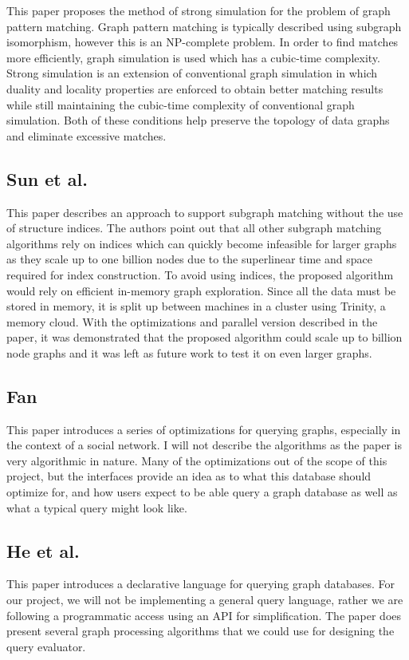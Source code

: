 \documentclass[11pt]{article}
\begin{document}
This paper \cite{Ma} proposes the method of strong simulation for the problem of graph pattern matching.  Graph pattern matching is typically described using subgraph isomorphism, however this is an NP-complete problem.  In order to find matches more efficiently, graph simulation is used which has a cubic-time complexity.  Strong simulation is an extension of conventional graph simulation in which duality and locality properties are enforced to obtain better matching results while still maintaining the cubic-time complexity of conventional graph simulation.  Both of these conditions help preserve the topology of data graphs and eliminate excessive matches.

\subsection{Sun et al.}

This paper \cite{Sun} describes an approach to support subgraph matching without the use of structure indices.  The authors point out that all other subgraph matching algorithms rely on indices which can quickly become infeasible for larger graphs as they scale up to one billion nodes due to the superlinear time and space required for index construction.  To avoid using indices, the proposed algorithm would rely on efficient in-memory graph exploration.  Since all the data must be stored in memory, it is split up between machines in a cluster using Trinity, a memory cloud.  With the optimizations and parallel version described in the paper, it was demonstrated that the proposed algorithm could scale up to billion node graphs and it was left as future work to test it on even larger graphs.

\subsection{Fan}

This paper \cite{Fan} introduces a series of optimizations for querying graphs, especially in the context of a social network. I will not describe the algorithms as the paper is very algorithmic in nature. Many of the optimizations out of the scope of this project, but the interfaces provide an idea as to what this database should optimize for, and how users expect to be able query a graph database as well as what a typical query might look like.

\subsection{He et al.}

This paper\cite{He} introduces a declarative language for querying graph databases. For our project, we will not be implementing a general query language, rather we are following a programmatic access using an API for simplification. The paper does present several graph processing algorithms that we could use for designing the query evaluator.



\end{document}
